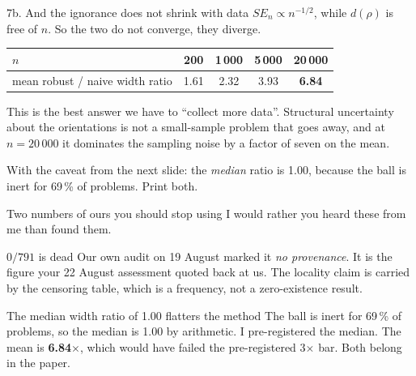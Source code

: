 \documentclass[10pt,aspectratio=169]{beamer}
\newcommand{\wn}[1]{\textcolor{warn}{#1}}
\begin{document}
\begin{frame}{7b. And the ignorance does not shrink with data}
$SE_n \propto n^{-1/2}$, while $d(\rho)$ is free of $n$. So the two do not converge, they diverge.

\begin{center}
\begin{tabular}{lcccc}
\toprule
$n$ & 200 & 1\,000 & 5\,000 & 20\,000 \\
\midrule
mean robust / naive width ratio & 1.61 & 2.32 & 3.93 & \textbf{6.84} \\
\bottomrule
\end{tabular}
\end{center}

\medskip
This is the best answer we have to ``collect more data''. Structural uncertainty about the
orientations is not a small-sample problem that goes away, and at $n = 20\,000$ it dominates
the sampling noise by a factor of seven on the mean.

\medskip
\wn{With the caveat from the next slide: the \emph{median} ratio is 1.00, because the ball is inert
for 69\,\% of problems. Print both.}
\end{frame}

\begin{frame}{Two numbers of ours you should stop using}
I would rather you heard these from me than found them.

\begin{alertblock}{$0/791$ is dead}
Our own audit on 19 August marked it \emph{no provenance}. It is the figure your 22 August
assessment quoted back at us. The locality claim is carried by the censoring table, which is a
frequency, not a zero-existence result.
\end{alertblock}

\begin{alertblock}{The median width ratio of 1.00 flatters the method}
The ball is inert for 69\,\% of problems, so the median is 1.00 by arithmetic. I pre-registered the
median. The mean is \textbf{6.84}$\times$, which would have failed the pre-registered
3$\times$ bar. Both belong in the paper.
\end{alertblock}
\end{frame}
\end{document}
